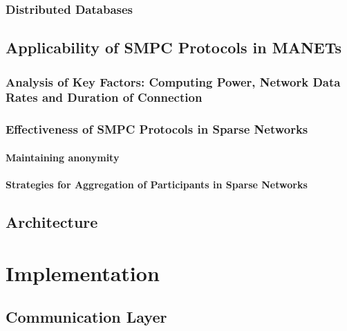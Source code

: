 		\subsection*{Distributed Databases}
		
	\section{Applicability of \gls{SMPC} Protocols in \gls{MANET}s}
	
		\subsection*{Analysis of Key Factors: Computing Power, Network Data Rates and Duration of Connection}
		
		\subsection*{Effectiveness of \gls{SMPC} Protocols in Sparse Networks}
		
			\subsubsection*{Maintaining anonymity}
		
			\subsubsection*{Strategies for Aggregation of Participants in Sparse Networks}
			
	\section{Architecture}
	

\chapter{Implementation }	

	
	\section{Communication Layer}
	
